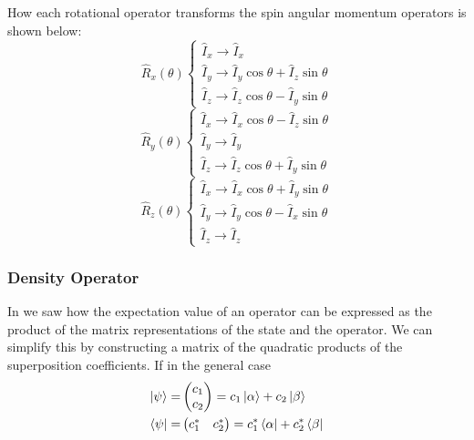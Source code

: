 How each rotational operator transforms the spin angular momentum operators is shown
below:
\begin{equation}
  \hat{R}_x(\theta) \begin{cases}
    \hat{I}_x \rightarrow \hat{I}_x \\
    \hat{I}_y \rightarrow \hat{I}_y\cos\theta + \hat{I}_z\sin\theta \\
    \hat{I}_z \rightarrow \hat{I}_z\cos\theta - \hat{I}_y\sin\theta
\end{cases}
\end{equation}
\begin{equation}
  \hat{R}_y(\theta) \begin{cases}
    \hat{I}_x \rightarrow \hat{I}_x\cos\theta - \hat{I}_z\sin\theta \\
    \hat{I}_y \rightarrow \hat{I}_y \\
    \hat{I}_z \rightarrow \hat{I}_z\cos\theta + \hat{I}_y\sin\theta
\end{cases}
\end{equation}
\begin{equation}
  \hat{R}_z(\theta) \begin{cases}
    \hat{I}_x \rightarrow \hat{I}_x\cos\theta + \hat{I}_y\sin\theta \\
    \hat{I}_y \rightarrow \hat{I}_y\cos\theta - \hat{I}_x\sin\theta \\
    \hat{I}_z \rightarrow \hat{I}_z
\end{cases}
\end{equation}


\subsubsection{Density Operator}\label{Density}

In  we saw how the expectation value of an operator can be expressed as
the product of the matrix representations of the state and the operator. We can simplify this by
constructing a matrix of the quadratic products of the superposition coefficients. If in the
general case
\begin{align}
\ket{\psi} =& \begin{pmatrix}
    c_1\\
    c_2
\end{pmatrix} = c_1\ket{\alpha} + c_2\ket{\beta}\\
\bra{\psi} =& \begin{pmatrix}
  c_1^* & c_2^*
\end{pmatrix} = c_1^*\bra{\alpha} + c_2^*\bra{\beta}
\end{align}

